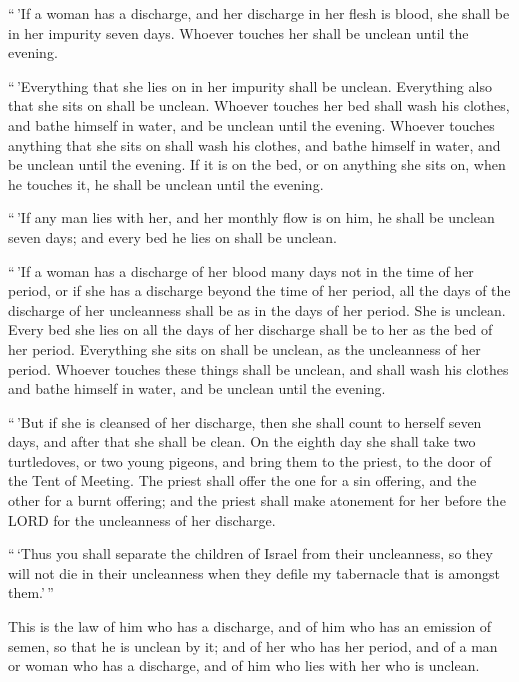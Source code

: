  ``\,'If a woman has a discharge, and her discharge in
her flesh is blood, she shall be in her impurity seven days. Whoever
touches her shall be unclean until the evening.

 ``\,'Everything that she lies on in her impurity shall
be unclean. Everything also that she sits on shall be unclean.
 Whoever touches her bed shall wash his clothes, and
bathe himself in water, and be unclean until the evening.
 Whoever touches anything that she sits on shall wash his
clothes, and bathe himself in water, and be unclean until the evening.
 If it is on the bed, or on anything she sits on, when he
touches it, he shall be unclean until the evening.

 ``\,'If any man lies with her, and her monthly flow is
on him, he shall be unclean seven days; and every bed he lies on shall
be unclean.

 ``\,'If a woman has a discharge of her blood many days
not in the time of her period, or if she has a discharge beyond the time
of her period, all the days of the discharge of her uncleanness shall be
as in the days of her period. She is unclean.  Every bed
she lies on all the days of her discharge shall be to her as the bed of
her period. Everything she sits on shall be unclean, as the uncleanness
of her period.  Whoever touches these things shall be
unclean, and shall wash his clothes and bathe himself in water, and be
unclean until the evening.

 ``\,'But if she is cleansed of her discharge, then she
shall count to herself seven days, and after that she shall be clean.
 On the eighth day she shall take two turtledoves, or two
young pigeons, and bring them to the priest, to the door of the Tent of
Meeting.  The priest shall offer the one for a sin
offering, and the other for a burnt offering; and the priest shall make
atonement for her before the LORD for the uncleanness of her discharge.

 ``\,`Thus you shall separate the children of Israel from
their uncleanness, so they will not die in their uncleanness when they
defile my tabernacle that is amongst them.'\,''

 This is the law of him who has a discharge, and of him
who has an emission of semen, so that he is unclean by it;
 and of her who has her period, and of a man or woman who
has a discharge, and of him who lies with her who is unclean.

